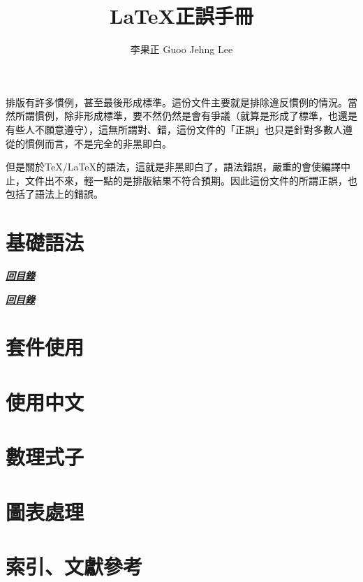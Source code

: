 \documentclass[11pt,a4paper]{article}
\title{\textsf{\textbf{\LaTeX 正誤手冊}}}
\author{\small 李果正 Guoo Jehng Lee}
\date{\small \zhtoday}
\newcommand{\back}{%
  \begin{flushright}
  \hyperlink{contents}{\textit{\textbf{\textcolor{bulgarianrose}{回目錄}}}}
  \end{flushright}}
\begin{document}
\maketitle

排版有許多慣例，甚至最後形成標準。這份文件主要就是排除違反慣例的情況。當然所謂慣例，除非形成標準，要不然仍然是會有爭議（就算是形成了標準，也還是有些人不願意遵守），這無所謂對、錯，這份文件的「正誤」也只是針對多數人遵從的慣例而言，不是完全的非黑即白。

但是關於\TeX/\LaTeX 的語法，這就是非黑即白了，語法錯誤，嚴重的會使編譯中止，文件出不來，輕一點的是排版結果不符合預期。因此這份文件的所謂正誤，也包括了語法上的錯誤。

\section{基礎語法}
\label{sec:syntax}



\back



\back



\section{套件使用}
\label{sec:package}

\section{使用中文}
\label{sec:chinese}

\section{數理式子}
\label{sec:math}

\section{圖表處理}
\label{sec:figure}

\section{索引、文獻參考}
\label{sec:index}

\clearpage
\hypertarget{contents}{}
\tableofcontents
\end{document}
